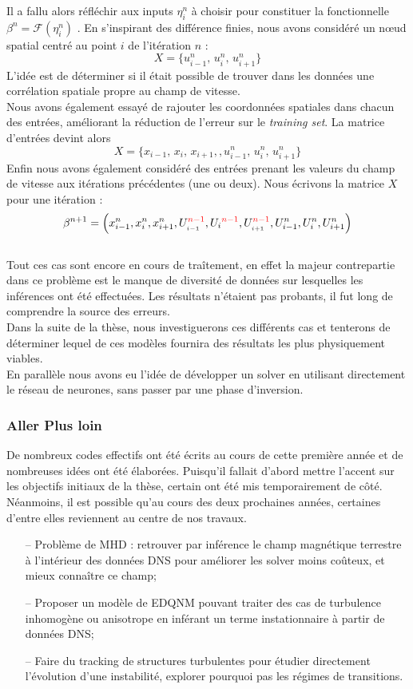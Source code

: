 \documentclass[a4paper,12pt]{article}
\newcommand{\bepar}[1]{
	\left( #1 \right)  
}
\newcommand\bk{\color{black}}
\newcommand\dsb{\color{dsb}}
\newcommand\red{\color{red}}
\numberwithin{equation}{section} %
\begin{document}
\noindent Il a fallu alors réfléchir aux inputs $\eta_i^n$ à choisir pour constituer la fonctionnelle $\beta^n = \mathcal{F}\bepar{\eta_i^n}$ . En s'inspirant des différence finies, nous avons considéré un nœud spatial centré au point $i$ de l'itération $n$ : $$X = \{ u^n_{i-1},\, u^n_{i},\, u^n_{i+1}\}$$ L'idée est de déterminer si il était possible de trouver dans les données une corrélation spatiale propre au champ de vitesse.\\
Nous avons également essayé de rajouter les coordonnées spatiales dans chacun des entrées, améliorant la réduction de l'erreur sur le \textit{training set}. La matrice d'entrées devint alors $$X = \{ x_{i-1}, \, x_i,\, x_{i+1},, u^n_{i-1},\, u^n_{i},\, u^n_{i+1}\}$$
Enfin nous avons également considéré des entrées prenant les valeurs du champ de vitesse aux itérations précédentes (une ou deux). Nous écrivons la matrice $X$ pour une itération : $$ \beta^{n+1} = \bepar{x_{i-1}^n, x_i^n, x^n_{i+1}, U_{_{\bk i-1}}^{\red n-1}, U_{\bk i}^{\red n-1}, U_{_{\bk i+1}}^{\red n-1}, U_{i-1}^n, U_i^n, U^n_{i+1}} $$\\
Tout ces cas sont encore en cours de traîtement, en effet la majeur contrepartie dans ce problème est le manque de diversité de données sur lesquelles les inférences ont été effectuées. Les résultats n'étaient pas probants, il fut long de comprendre la source des erreurs. \\
Dans la suite de la thèse, nous investiguerons ces différents cas et tenterons de déterminer lequel de ces modèles fournira des résultats les plus physiquement viables.\\
En parallèle nous avons eu l'idée de développer un solver en utilisant directement le réseau de neurones, sans passer par une phase d'inversion.\\

\dsb \subsubsection{Aller Plus loin} \bk
\noindent De nombreux codes effectifs ont été écrits au cours de cette première année et de nombreuses idées ont été élaborées. Puisqu'il fallait d'abord mettre l'accent sur les objectifs initiaux de la thèse, certain ont été mis temporairement de côté.\\
 Néanmoins, il est possible qu'au cours des deux prochaines années, certaines d'entre elles reviennent au centre de nos travaux.
 \begin{itemize}[leftmargin=1cm]
 \item[--] Problème de MHD : retrouver par inférence le champ magnétique terrestre à l'intérieur des données DNS pour améliorer les solver moins coûteux, et mieux connaître ce champ;
 \item[--] Proposer un modèle de EDQNM pouvant traiter des cas de turbulence inhomogène ou anisotrope en inférant un terme instationnaire à partir de données DNS;
 \item[--] Faire du tracking de structures turbulentes pour étudier directement l'évolution d'une instabilité, explorer pourquoi pas les régimes de transitions.
 \end{itemize}
\end{document}
